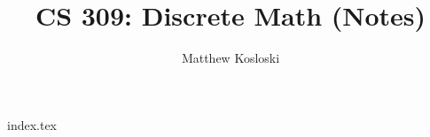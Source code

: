 \documentclass[12pt]{report}
\title{CS 309: Discrete Math (Notes)}
\author{Matthew Kosloski}
\date{ }
\begin{document}
\maketitle
\tableofcontents
{index.tex}
\end{document}
